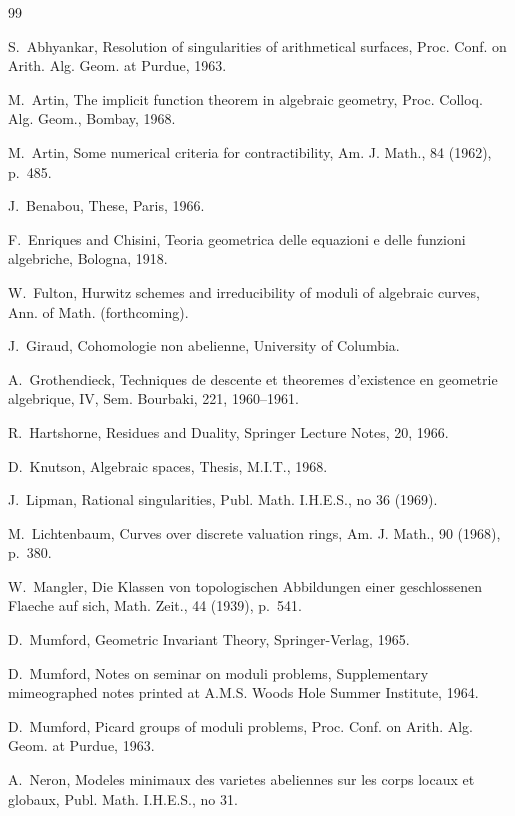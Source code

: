 \documentclass[10pt]{amsart}
\theoremstyle{plain}
\theoremstyle{definition}
\begin{document}
\begin{thebibliography}{99}

 S.~Abhyankar, Resolution of singularities of arithmetical surfaces, Proc. Conf. on Arith. Alg. Geom. at Purdue, 1963.

 M.~Artin, The implicit function theorem in algebraic geometry, Proc. Colloq. Alg. Geom., Bombay, 1968.

 M.~Artin, Some numerical criteria for contractibility, Am. J. Math., 84 (1962), p.~485.

 J.~Benabou, These, Paris, 1966.

 F.~Enriques and Chisini, Teoria geometrica delle equazioni e delle funzioni algebriche, Bologna, 1918.

 W.~Fulton, Hurwitz schemes and irreducibility of moduli of algebraic curves, Ann. of Math. (forthcoming).

 J.~Giraud, Cohomologie non abelienne, University of Columbia.

 A.~Grothendieck, Techniques de descente et theoremes d'existence en geometrie algebrique, IV, Sem. Bourbaki, 221, 1960--1961.

 R.~Hartshorne, Residues and Duality, Springer Lecture Notes, 20, 1966.

 D.~Knutson, Algebraic spaces, Thesis, M.I.T., 1968.

 J.~Lipman, Rational singularities, Publ. Math. I.H.E.S., no 36 (1969).

 M.~Lichtenbaum, Curves over discrete valuation rings, Am. J. Math., 90 (1968), p.~380.

 W.~Mangler, Die Klassen von topologischen Abbildungen einer geschlossenen Flaeche auf sich, Math. Zeit., 44 (1939), p.~541.

 D.~Mumford, Geometric Invariant Theory, Springer-Verlag, 1965.

 D.~Mumford, Notes on seminar on moduli problems, Supplementary mimeographed notes printed at A.M.S. Woods Hole Summer Institute, 1964.

 D.~Mumford, Picard groups of moduli problems, Proc. Conf. on Arith. Alg. Geom. at Purdue, 1963.

 A.~Neron, Modeles minimaux des varietes abeliennes sur les corps locaux et globaux, Publ. Math. I.H.E.S., no 31.


\end{thebibliography}
\end{document}
